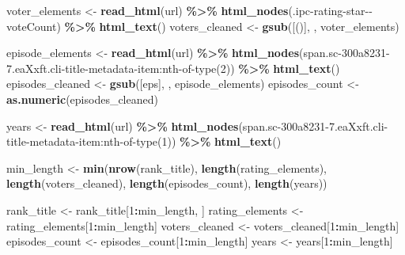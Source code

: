\documentclass[
]{article}
\newenvironment{Shaded}{\begin{snugshade}}{\end{snugshade}}
\newcommand{\DecValTok}[1]{\textcolor[rgb]{0.00,0.00,0.81}{#1}}
\newcommand{\FunctionTok}[1]{\textcolor[rgb]{0.13,0.29,0.53}{\textbf{#1}}}
\newcommand{\NormalTok}[1]{#1}
\newcommand{\OtherTok}[1]{\textcolor[rgb]{0.56,0.35,0.01}{#1}}
\newcommand{\SpecialCharTok}[1]{\textcolor[rgb]{0.81,0.36,0.00}{\textbf{#1}}}
\newcommand{\StringTok}[1]{\textcolor[rgb]{0.31,0.60,0.02}{#1}}
\begin{document}
\begin{Shaded}
\begin{Highlighting}[]
\NormalTok{voter\_elements }\OtherTok{\textless{}{-}} \FunctionTok{read\_html}\NormalTok{(url) }\SpecialCharTok{\%\textgreater{}\%}
  \FunctionTok{html\_nodes}\NormalTok{(}\StringTok{\textquotesingle{}.ipc{-}rating{-}star{-}{-}voteCount\textquotesingle{}}\NormalTok{) }\SpecialCharTok{\%\textgreater{}\%}
  \FunctionTok{html\_text}\NormalTok{()}
\NormalTok{voters\_cleaned }\OtherTok{\textless{}{-}} \FunctionTok{gsub}\NormalTok{(}\StringTok{\textquotesingle{}[()]\textquotesingle{}}\NormalTok{, }\StringTok{\textquotesingle{}\textquotesingle{}}\NormalTok{, voter\_elements)}

\NormalTok{episode\_elements }\OtherTok{\textless{}{-}} \FunctionTok{read\_html}\NormalTok{(url) }\SpecialCharTok{\%\textgreater{}\%}
  \FunctionTok{html\_nodes}\NormalTok{(}\StringTok{\textquotesingle{}span.sc{-}300a8231{-}7.eaXxft.cli{-}title{-}metadata{-}item:nth{-}of{-}type(2)\textquotesingle{}}\NormalTok{) }\SpecialCharTok{\%\textgreater{}\%}
  \FunctionTok{html\_text}\NormalTok{()}
\NormalTok{episodes\_cleaned }\OtherTok{\textless{}{-}} \FunctionTok{gsub}\NormalTok{(}\StringTok{\textquotesingle{}[eps]\textquotesingle{}}\NormalTok{, }\StringTok{\textquotesingle{}\textquotesingle{}}\NormalTok{, episode\_elements)}
\NormalTok{episodes\_count }\OtherTok{\textless{}{-}} \FunctionTok{as.numeric}\NormalTok{(episodes\_cleaned)}

\NormalTok{years }\OtherTok{\textless{}{-}} \FunctionTok{read\_html}\NormalTok{(url) }\SpecialCharTok{\%\textgreater{}\%}
  \FunctionTok{html\_nodes}\NormalTok{(}\StringTok{\textquotesingle{}span.sc{-}300a8231{-}7.eaXxft.cli{-}title{-}metadata{-}item:nth{-}of{-}type(1)\textquotesingle{}}\NormalTok{) }\SpecialCharTok{\%\textgreater{}\%}
  \FunctionTok{html\_text}\NormalTok{()}

\NormalTok{min\_length }\OtherTok{\textless{}{-}} \FunctionTok{min}\NormalTok{(}\FunctionTok{nrow}\NormalTok{(rank\_title), }\FunctionTok{length}\NormalTok{(rating\_elements), }\FunctionTok{length}\NormalTok{(voters\_cleaned), }\FunctionTok{length}\NormalTok{(episodes\_count), }\FunctionTok{length}\NormalTok{(years))}

\NormalTok{rank\_title }\OtherTok{\textless{}{-}}\NormalTok{ rank\_title[}\DecValTok{1}\SpecialCharTok{:}\NormalTok{min\_length, ]}
\NormalTok{rating\_elements }\OtherTok{\textless{}{-}}\NormalTok{ rating\_elements[}\DecValTok{1}\SpecialCharTok{:}\NormalTok{min\_length]}
\NormalTok{voters\_cleaned }\OtherTok{\textless{}{-}}\NormalTok{ voters\_cleaned[}\DecValTok{1}\SpecialCharTok{:}\NormalTok{min\_length]}
\NormalTok{episodes\_count }\OtherTok{\textless{}{-}}\NormalTok{ episodes\_count[}\DecValTok{1}\SpecialCharTok{:}\NormalTok{min\_length]}
\NormalTok{years }\OtherTok{\textless{}{-}}\NormalTok{ years[}\DecValTok{1}\SpecialCharTok{:}\NormalTok{min\_length]}


\end{Highlighting}
\end{Shaded}
\end{document}
